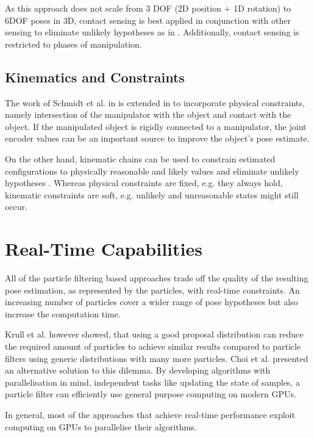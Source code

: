 As this approach does not scale from 3 DOF (2D position + 1D rotation) to 6DOF poses in 3D, contact sensing is best applied in conjunction with other sensing to eliminate unlikely hypotheses as in \cite{Schmidt2015b}. Additionally, contact sensing is restricted to phases of manipulation.

\subsection{Kinematics and Constraints}

The work of Schmidt et al. in \cite{Schmidt2015} is extended in \cite{Schmidt2015b} to incorporate physical constraints, namely intersection of the manipulator with the object and contact with the object.
If the manipulated object is rigidly connected to a manipulator, the joint encoder values can be an important source to improve the object's pose estimate.

On the other hand, kinematic chains can be used to constrain estimated configurations to physically reasonable and likely values and eliminate unlikely hypotheses \cite{Shotton2013,Sharp2015}.
Whereas physical constraints are fixed, e.g. they always hold, kinematic constraints are soft, e.g. unlikely and unreasonable states might still occur.

\section{Real-Time Capabilities}

All of the particle filtering based approaches trade off the quality of the resulting pose estimation, as represented by the particles, with real-time constraints. An increasing number of particles cover a wider range of pose hypotheses but also increase the computation time.

Krull et al. \cite{Krull2015} however showed, that using a good proposal distribution can reduce the required amount of particles to achieve similar results compared to particle filters using generic distributions with many more particles. Choi et al. \cite{Choi2013} presented an alternative solution to this dilemma. By developing algorithms with parallelisation in mind, independent tasks like updating the state of samples, a particle filter can efficiently use general purpose computing on modern GPUs.

In general, most of the approaches that achieve real-time performance exploit computing on GPUs to parallelise their algorithms.

